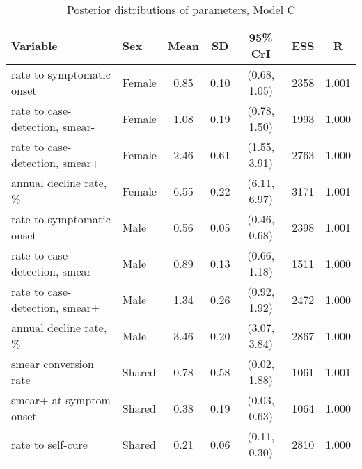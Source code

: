 \begin{table}[h]

\caption{\label{tab:}Posterior distributions of parameters, Model C}
\centering
\begin{tabular}[t]{llccccc}
\toprule
Variable & Sex & Mean & SD & 95\% CrI & ESS & \^{R}\\
\midrule
rate to symptomatic onset & Female & 0.85 & 0.10 & (0.68, 1.05) & 2358 & 1.001\\
rate to case-detection, smear- & Female & 1.08 & 0.19 & (0.78, 1.50) & 1993 & 1.000\\
rate to case-detection, smear+ & Female & 2.46 & 0.61 & (1.55, 3.91) & 2763 & 1.000\\
annual decline rate, \% & Female & 6.55 & 0.22 & (6.11, 6.97) & 3171 & 1.001\\
\addlinespace
rate to symptomatic onset & Male & 0.56 & 0.05 & (0.46, 0.68) & 2398 & 1.001\\
rate to case-detection, smear- & Male & 0.89 & 0.13 & (0.66, 1.18) & 1511 & 1.000\\
rate to case-detection, smear+ & Male & 1.34 & 0.26 & (0.92, 1.92) & 2472 & 1.000\\
annual decline rate, \% & Male & 3.46 & 0.20 & (3.07, 3.84) & 2867 & 1.000\\
\addlinespace
smear conversion rate & Shared & 0.78 & 0.58 & (0.02, 1.88) & 1061 & 1.001\\
smear+ at symptom onset & Shared & 0.38 & 0.19 & (0.03, 0.63) & 1064 & 1.000\\
rate to self-cure & Shared & 0.21 & 0.06 & (0.11, 0.30) & 2810 & 1.000\\
\bottomrule
\end{tabular}
\end{table}
